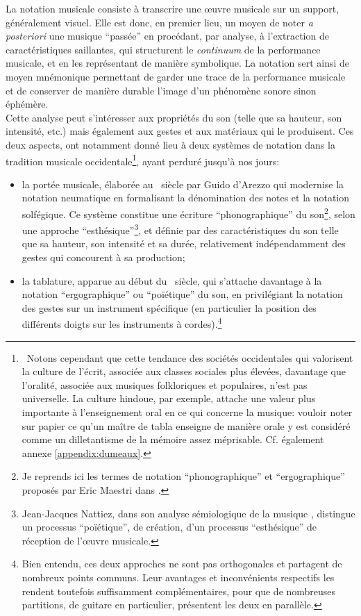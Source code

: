 \noindent La notation musicale consiste à transcrire une œuvre musicale sur un support, généralement visuel. Elle est donc, en premier lieu, un moyen de noter \textit{a posteriori} une musique ``passée'' en procédant, par analyse, à l'extraction de caractéristiques saillantes, qui structurent le \textit{continuum} de la performance musicale, et en les représentant de manière symbolique. La notation sert ainsi de moyen mnémonique permettant de garder une trace de la performance musicale et de conserver de manière durable l'image d'un phénomène sonore sinon éphémère.\\
\indent Cette analyse peut s'intéresser aux propriétés du son (telle que sa hauteur, son intensité, etc.) mais également aux gestes et aux matériaux qui le produisent. Ces deux aspects, ont notamment donné lieu à deux systèmes de notation dans la tradition musicale occidentale\footnote{~Notons cependant que cette tendance des sociétés occidentales qui valorisent la culture de l'écrit, associée aux classes sociales plus élevées, davantage que l'oralité, associée aux musiques folkloriques et populaires, n'est pas universelle. La culture hindoue, par exemple, attache une valeur plus importante à l'enseignement oral en ce qui concerne la musique: vouloir noter sur papier ce qu'un maître de tabla enseigne de manière orale y est considéré comme un dilletantisme de la mémoire assez méprisable. Cf. également annexe \ref{appendix:dumeaux}.}, ayant perduré jusqu'à nos jours:
\vspace{-1em}
\begin{itemize}[noitemsep]
	\item la portée musicale, élaborée au ~siècle par Guido d'Arezzo qui modernise la notation neumatique en formalisant la dénomination des notes et la notation solfégique. Ce système constitue une écriture ``phonographique'' du son\footnote{Je reprends ici les termes de notation ``phonographique'' et ``ergographique'' proposés par Eric Maestri dans \cite{maestri_notation_2016}.}, selon une approche ``esthésique''\footnote{Jean-Jacques Nattiez, dans son analyse sémiologique de la musique \cite{nattiez_musicologie_1987}, distingue un processus ``poïétique'', de création, d'un processus ``esthésique'' de réception de l'œuvre musicale.}, et définie par des caractéristiques du son telle que sa hauteur, son intensité et sa durée, relativement indépendamment des gestes qui concourent à sa production;
	\item la tablature, apparue au début du ~siècle, qui s'attache davantage à la notation ``ergographique'' ou ``poïétique'' du son, en privilégiant la notation des gestes sur un instrument spécifique (en particulier la position des différents doigts sur les instruments à cordes).\footnote{Bien entendu, ces deux approches ne sont pas orthogonales et partagent de nombreux points communs. Leur avantages et inconvénients respectifs les rendent toutefois suffisamment complémentaires, pour que de nombreuses partitions, de guitare en particulier, présentent les deux en parallèle.}
\end{itemize}

